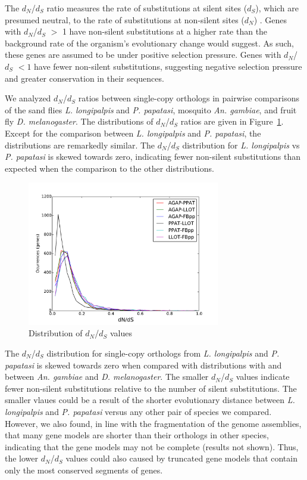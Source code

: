 The $d_N$/$d_S$ ratio measures the rate of substitutions at silent sites ($d_S$), which are presumed neutral, to the rate of substitutions at non-silent sites ($d_N$) \cite{Kryazhimskiy2008}. Genes with $d_N$/$d_S$ $>$ 1 have non-silent substitutions at a higher rate than the background rate of the organism's evolutionary change would suggest.  As such, these genes are assumed to be under positive selection pressure.  Genes with $d_N$/$d_S$ $<1$ have fewer non-silent substitutions, suggesting negative selection pressure and greater conservation in their sequences.

We analyzed $d_N$/$d_S$ ratios between single-copy orthologs in pairwise comparisons of the sand flies \emph{L. longipalpis} and \emph{P. papatasi}, mosquito \emph{An. gambiae}, and fruit fly \emph{D. melanogaster}.  The distributions of $d_N$/$d_S$ ratios are given in Figure~\ref{fig:dnds-distr}.  Except for the comparison between \emph{L. longipalpis} and \emph{P. papatasi}, the distributions are remarkedly similar.  The $d_N$/$d_S$ distribution for \emph{L. longipalpis} vs \emph{P. papatasi} is skewed towards zero, indicating fewer non-silent substitutions than expected when the comparison to the other distributions.

\begin{figure}[H]
  \centering
  \includegraphics[width=0.75\textwidth]{figures/ka_ks/dN_dS}
  \caption{Distribution of $d_N$/$d_S$ values}
  \label{fig:dnds-distr}
\end{figure}


The $d_N$/$d_S$ distribution for single-copy orthologs from \emph{L. longipalpis} and \emph{P. papatasi} is skewed towards zero when compared with distributions with and between \emph{An. gambiae} and \emph{D. melanogaster}.  The smaller $d_N$/$d_S$ values indicate fewer non-silent substitutions relative to the number of silent substitutions.  The smaller vlaues could be a result of the shorter evolutionary distance between \emph{L. longipalpis} and \emph{P. papatasi} versus any other pair of species we compared.  However, we also found, in line with the fragmentation of the genome assemblies, that many gene models are shorter than their orthologs in other species, indicating that the gene models may not be complete (results not shown).  Thus, the lower $d_N$/$d_S$ values could also caused by truncated gene models that contain only the most conserved segments of genes.


